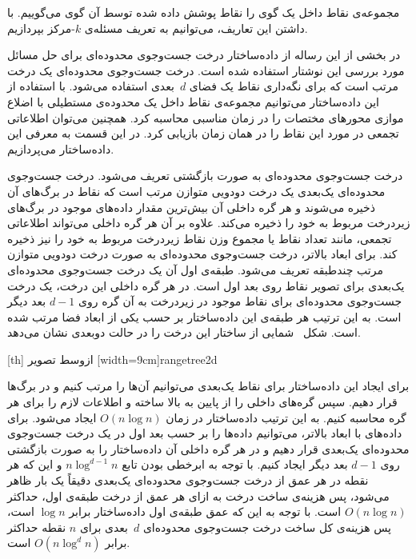 مجموعه‌ی نقاط داخل یک گوی را نقاط پوشش داده شده توسط آن گوی می‌گوییم. با داشتن این تعاریف، می‌توانیم به تعریف مسئله‌ی $k$-مرکز بپردازیم.



در بخشی از این رساله از داده‌ساختار درخت جست‌وجوی محدوده‌ای  برای حل مسائل مورد بررسی این نوشتار استفاده شده است. درخت جست‌وجوی محدوده‌ای یک درخت مرتب است که برای نگه‌داری نقاط یک فضای $d$~بعدی استفاده می‌شود. با استفاده از این داده‌ساختار می‌توانیم مجموعه‌ی نقاط داخل یک محدوده‌ی مستطیلی با اضلاع موازی محورهای مختصات را در زمان مناسبی محاسبه کرد. همچنین می‌توان اطلاعاتی تجمعی در مورد این نقاط را در همان زمان بازیابی کرد. در این قسمت به معرفی این داده‌ساختار می‌پردازیم.


درخت جست‌وجوی محدوده‌ای به صورت بازگشتی تعریف می‌شود. درخت جست‌وجوی محدوده‌ای یک‌بعدی یک درخت دودویی متوازن مرتب است که نقاط در برگ‌های آن ذخیره می‌شوند و هر گره داخلی آن بیش‌ترین مقدار داده‌های موجود در برگ‌های زیردرخت مربوط به خود را ذخیره می‌کند. علاوه بر آن هر گره داخلی می‌تواند اطلاعاتی تجمعی، مانند تعداد نقاط یا مجموع وزن نقاط زیردرخت مربوط به خود را نیز ذخیره کند. برای ابعاد بالاتر، درخت جست‌وجوی محدوده‌ای به صورت درخت دودویی متوازن مرتب چندطبقه تعریف می‌شود. طبقه‌‌ی اول آن یک درخت جست‌وجوی محدوده‌ای یک‌بعدی برای تصویر نقاط روی بعد اول است. در هر گره داخلی این درخت، یک درخت جست‌وجوی محدوده‌ای برای نقاط موجود در زیردرخت به آن گره روی $d-1$ بعد دیگر است. به این ترتیب هر طبقه‌ی این داده‌ساختار بر حسب یکی از ابعاد فضا مرتب شده است. شکل~ شمایی از ساختار این درخت را در حالت دوبعدی نشان می‌دهد.

[th]
‌ازوسط
‌تصویر
[width=9cm]{rangetree2d}


برای ایجاد این داده‌ساختار برای نقاط یک‌بعدی می‌توانیم آن‌ها را مرتب کنیم و در برگ‌ها قرار دهیم. سپس گره‌های داخلی را از پایین به بالا ساخته و اطلاعات لازم را برای هر گره محاسبه کنیم. به این ترتیب داده‌ساختار در زمان $O(n \log n)$ ایجاد می‌شود. برای داده‌های با ابعاد بالاتر، می‌توانیم داده‌ها را بر حسب بعد اول در یک درخت جست‌وجوی محدوده‌ای یک‌بعدی قرار دهیم و در هر گره داخلی آن داده‌ساختار را به صورت بازگشتی روی $d-1$ بعد دیگر ایجاد کنیم. با توجه به ابرخطی بودن تابع $n \log^{d-1} n$ و این که هر نقطه در هر عمق از درخت جست‌وجوی محدوده‌ای یک‌بعدی دقیقاً یک بار ظاهر می‌شود، پس هزینه‌ی ساخت درخت به ازای هر عمق از درخت طبقه‌ی اول، حداکثر $O(n \log n)$ است. با توجه به این که عمق طبقه‌ی اول داده‌ساختار برابر $\log n$ است، پس هزینه‌ی کل ساخت درخت جست‌وجوی محدوده‌ای $d$~بعدی برای $n$ نقطه حداکثر برابر $O(n \log^d n)$ است.


